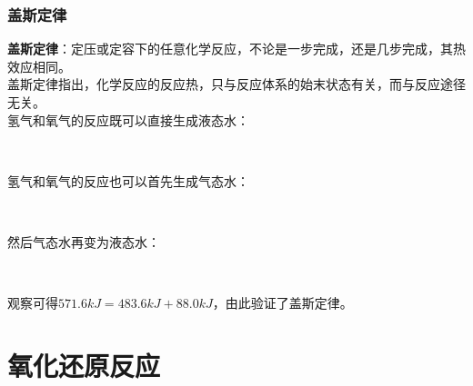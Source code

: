 \documentclass[UTF8]{ctexart}
\begin{document}
\newpage

\subsubsection{盖斯定律}
    \textbf{盖斯定律}：定压或定容下的任意化学反应，不论是一步完成，还是几步完成，其热效应相同。\\[3mm]
    盖斯定律指出，化学反应的反应热，只与反应体系的始末状态有关，而与反应途径无关。\\[3mm]
    氢气和氧气的反应既可以直接生成液态水：
    \begin{center}
        \\[6mm]
    \end{center}
    氢气和氧气的反应也可以首先生成气态水：
    \begin{center}
        \\[6mm]
    \end{center}
    然后气态水再变为液态水：
    \begin{center}
        \\[6mm]
    \end{center}
    观察可得$571.6\si{kJ}=483.6\si{kJ}+88.0\si{kJ}$，由此验证了盖斯定律。

\newpage

\section{氧化还原反应}
\end{document}
